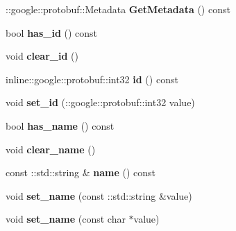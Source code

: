 \begin{DoxyCompactItemize}
\item 
\hypertarget{class_game_entity_aac721e84e4bde7e73558dc1b705b3368}{}\+::google\+::protobuf\+::\+Metadata {\bfseries Get\+Metadata} () const \label{class_game_entity_aac721e84e4bde7e73558dc1b705b3368}

\item 
\hypertarget{class_game_entity_ae5a31e6e2821400231140a09a6a6fd67}{}bool {\bfseries has\+\_\+id} () const \label{class_game_entity_ae5a31e6e2821400231140a09a6a6fd67}

\item 
\hypertarget{class_game_entity_adabd08d52e2c6389aff70a80461f45b3}{}void {\bfseries clear\+\_\+id} ()\label{class_game_entity_adabd08d52e2c6389aff70a80461f45b3}

\item 
\hypertarget{class_game_entity_af05a09cc0df4c9e742b3a4c3d6c698ca}{}inline\+::google\+::protobuf\+::int32 {\bfseries id} () const \label{class_game_entity_af05a09cc0df4c9e742b3a4c3d6c698ca}

\item 
\hypertarget{class_game_entity_a2ebfb94e8e4796971d865d2422df496b}{}void {\bfseries set\+\_\+id} (\+::google\+::protobuf\+::int32 value)\label{class_game_entity_a2ebfb94e8e4796971d865d2422df496b}

\item 
\hypertarget{class_game_entity_a88030133de49f7fe670330e3cc929b6b}{}bool {\bfseries has\+\_\+name} () const \label{class_game_entity_a88030133de49f7fe670330e3cc929b6b}

\item 
\hypertarget{class_game_entity_af2da515bc6f89f976618f066e7ce2d0c}{}void {\bfseries clear\+\_\+name} ()\label{class_game_entity_af2da515bc6f89f976618f066e7ce2d0c}

\item 
\hypertarget{class_game_entity_a40520ca73e5569e7914053bb93ec7092}{}const \+::std\+::string \& {\bfseries name} () const \label{class_game_entity_a40520ca73e5569e7914053bb93ec7092}

\item 
\hypertarget{class_game_entity_a7ad33d3d3201374885cd4460f15662f6}{}void {\bfseries set\+\_\+name} (const \+::std\+::string \&value)\label{class_game_entity_a7ad33d3d3201374885cd4460f15662f6}

\item 
\hypertarget{class_game_entity_a6a4ff6c04ca52c8d94090f7c556673d5}{}void {\bfseries set\+\_\+name} (const char $\ast$value)\label{class_game_entity_a6a4ff6c04ca52c8d94090f7c556673d5}


\end{DoxyCompactItemize}
